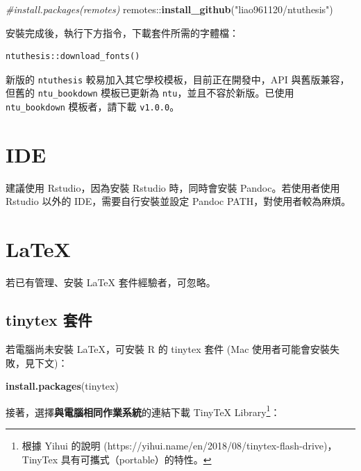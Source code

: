 \documentclass[]{book}
\newenvironment{Shaded}{}{}
\newcommand{\CommentTok}[1]{\textcolor[rgb]{0.38,0.63,0.69}{\textit{#1}}}
\newcommand{\KeywordTok}[1]{\textcolor[rgb]{0.00,0.44,0.13}{\textbf{#1}}}
\newcommand{\NormalTok}[1]{#1}
\newcommand{\OperatorTok}[1]{\textcolor[rgb]{0.40,0.40,0.40}{#1}}
\newcommand{\StringTok}[1]{\textcolor[rgb]{0.25,0.44,0.63}{#1}}
\begin{document}
\begin{Shaded}
\begin{Highlighting}[]
\CommentTok{\#install.packages(\textquotesingle{}remotes\textquotesingle{})}
\NormalTok{remotes}\OperatorTok{::}\KeywordTok{install\_github}\NormalTok{(}\StringTok{"liao961120/ntuthesis"}\NormalTok{)}
\end{Highlighting}
\end{Shaded}

安裝完成後，執行下方指令，下載套件所需的字體檔：

\begin{verbatim}
ntuthesis::download_fonts()
\end{verbatim}

新版的 \texttt{ntuthesis} 較易加入其它學校模板，目前正在開發中，API
與舊版兼容，但舊的 \texttt{ntu\_bookdown} 模板已更新為
\texttt{ntu}，並且不容於新版。已使用 \texttt{ntu\_bookdown}
模板者，請下載 \texttt{v1.0.0}。

\hypertarget{ide}{%
\section{IDE}\label{ide}}

建議使用 Rstudio，因為安裝 Rstudio 時，同時會安裝 Pandoc。若使用者使用
Rstudio 以外的 IDE，需要自行安裝並設定 Pandoc PATH，對使用者較為麻煩。

\hypertarget{latex}{%
\section{LaTeX}\label{latex}}

若已有管理、安裝 LaTeX 套件經驗者，可忽略。

\hypertarget{tinytex-ux5957ux4ef6}{%
\subsection{tinytex 套件}\label{tinytex-ux5957ux4ef6}}

若電腦尚未安裝 LaTeX，可安裝 R 的 tinytex 套件 (Mac
使用者可能會安裝失敗，見下文)：

\begin{Shaded}
\begin{Highlighting}[]
\KeywordTok{install.packages}\NormalTok{(}\StringTok{\textquotesingle{}tinytex\textquotesingle{}}\NormalTok{)}
\end{Highlighting}
\end{Shaded}

接著，選擇\textbf{與電腦相同作業系統}的連結下載 TinyTeX
Library\footnote{根據 Yihui 的說明
  (https://yihui.name/en/2018/08/tinytex-flash-drive)，TinyTex
  具有可攜式（portable）的特性。}：
\end{document}
